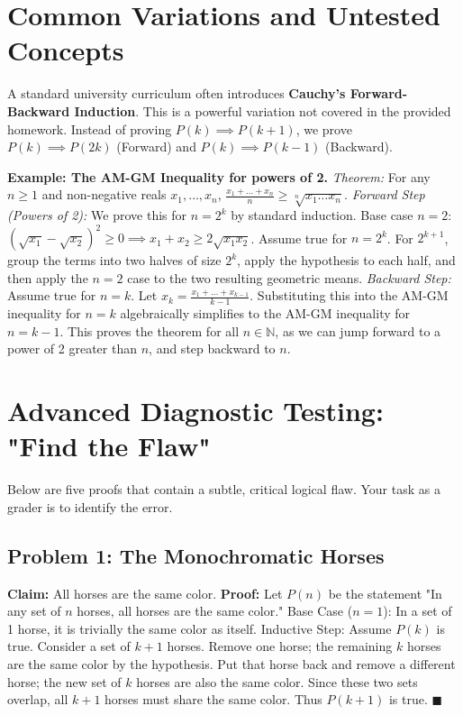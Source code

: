 \documentclass[11pt, a4paper]{article}
\theoremstyle{definition}
\theoremstyle{remark}
\newcommand{\N}{\mathbb{N}}
\begin{document}
\newpage
\section{Common Variations and Untested Concepts}

A standard university curriculum often introduces \textbf{Cauchy's Forward-Backward Induction}. This is a powerful variation not covered in the provided homework. Instead of proving $P(k) \implies P(k+1)$, we prove $P(k) \implies P(2k)$ (Forward) and $P(k) \implies P(k-1)$ (Backward).

\textbf{Example: The AM-GM Inequality for powers of 2.}
\textit{Theorem:} For any $n \ge 1$ and non-negative reals $x_1, \dots, x_n$, $\frac{x_1 + \dots + x_n}{n} \ge \sqrt[n]{x_1 \dots x_n}$.
\textit{Forward Step (Powers of 2):} We prove this for $n = 2^k$ by standard induction.
Base case $n=2$: $(\sqrt{x_1} - \sqrt{x_2})^2 \ge 0 \implies x_1 + x_2 \ge 2\sqrt{x_1 x_2}$.
Assume true for $n=2^k$. For $2^{k+1}$, group the terms into two halves of size $2^k$, apply the hypothesis to each half, and then apply the $n=2$ case to the two resulting geometric means.
\textit{Backward Step:} Assume true for $n=k$. Let $x_k = \frac{x_1 + \dots + x_{k-1}}{k-1}$. Substituting this into the AM-GM inequality for $n=k$ algebraically simplifies to the AM-GM inequality for $n=k-1$. 
This proves the theorem for all $n \in \N$, as we can jump forward to a power of 2 greater than $n$, and step backward to $n$.

\section{Advanced Diagnostic Testing: "Find the Flaw"}

Below are five proofs that contain a subtle, critical logical flaw. Your task as a grader is to identify the error.

\subsection*{Problem 1: The Monochromatic Horses}
\textbf{Claim:} All horses are the same color.
\textbf{Proof:} Let $P(n)$ be the statement "In any set of $n$ horses, all horses are the same color."
Base Case ($n=1$): In a set of 1 horse, it is trivially the same color as itself.
Inductive Step: Assume $P(k)$ is true. Consider a set of $k+1$ horses. Remove one horse; the remaining $k$ horses are the same color by the hypothesis. Put that horse back and remove a different horse; the new set of $k$ horses are also the same color. Since these two sets overlap, all $k+1$ horses must share the same color. Thus $P(k+1)$ is true. $\blacksquare$
\end{document}
